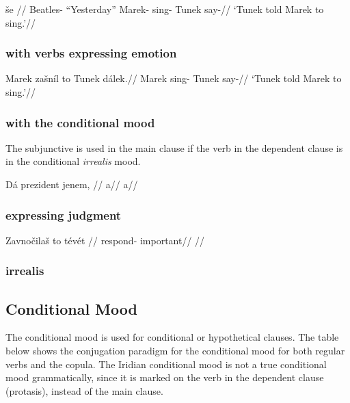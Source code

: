 \pex
\begingl
\gla \v{s}e //
\glb Beatles- ``Yesterday'' Marek- sing-  Tunek say-//
\glft `Tunek told Marek to sing.'//
\endgl
\xe

\subsubsection{with verbs expressing emotion}

\pex
\begingl
\gla Marek za\v{s}n\'il to Tunek dálek.//
\glb Marek sing-  Tunek say-//
\glft `Tunek told Marek to sing.'//
\endgl
\xe


\subsubsection{with the conditional mood}
\par The subjunctive is used in the main clause if the verb in the dependent clause is in the conditional \textit{irrealis} mood.

\pex
\begingl
\gla Dá prezident jenem, //
\glb a//
\glft a//
\endgl
\xe

\subsubsection{expressing judgment}

\pex
\begingl
\gla Zavno\v{c}ila\v{s} to t\'ev\'et //
\glb respond-  important//
\glft {}//
\endgl
\xe

\subsubsection{irrealis}

\subsection{Conditional Mood}\label{sec:conditional}
\par The conditional mood is used for conditional or hypothetical clauses. The table below shows the conjugation paradigm for the conditional mood for both regular verbs and the copula. The Iridian conditional mood is not a true conditional mood grammatically, since it is marked on the verb in the dependent clause (protasis), instead of the main clause.

